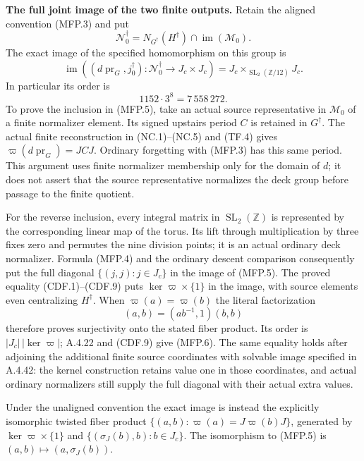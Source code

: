 \par\medskip\noindent\textbf{The full joint image of the two finite outputs.}\quad
Retain the aligned convention (MFP.3) and put
\[
 \mathcal N_0^\dagger
   =N_{G^\dagger}(H^\dagger)\cap\operatorname{im}(\mathcal M_0).
\]
The exact image of the specified homomorphism on this group is
\[
 \operatorname{im}\!\left(
   (d\operatorname{pr}_G,j_0^\dagger):
   \mathcal N_0^\dagger\longrightarrow J_c\times J_c\right)
     =J_c\mathbin{\times}_{\operatorname{SL}_2(\mathbb Z/12)}J_c.
                                                               \tag{MFP.5}
\]
In particular its order is
\[
                  1152\cdot3^8=7\,558\,272.
                                                               \tag{MFP.6}
\]
To prove the inclusion in (MFP.5), take an actual source representative
in $\mathcal M_0$ of a finite normalizer element.  Its signed upstairs
period $C$ is retained in $G^\dagger$.  The actual finite reconstruction
in (NC.1)--(NC.5) and (TF.4) gives
$\varpi(d\operatorname{pr}_G)=JCJ$.  Ordinary forgetting with (MFP.3)
has this same period.  This argument uses finite normalizer membership
only for the domain of $d$; it does not assert that the source
representative normalizes the deck group before passage to the
finite quotient.

For the reverse inclusion, every integral matrix in
$\operatorname{SL}_2(\mathbb Z)$ is represented by the corresponding
linear map of the torus.  Its lift through multiplication by three
fixes zero and permutes the nine division points; it is an actual
ordinary deck normalizer.  Formula (MFP.4) and the ordinary descent
comparison consequently put the full diagonal $\{(j,j):j\in J_c\}$
in the image of (MFP.5).  The proved equality (CDF.1)--(CDF.9) puts
$\ker\varpi\times\{1\}$ in the image, with source elements even
centralizing $H^\dagger$.  When $\varpi(a)=\varpi(b)$ the literal
factorization
\[
                   (a,b)=(ab^{-1},1)(b,b)
                                                               \tag{MFP.7}
\]
therefore proves surjectivity onto the stated fiber product.
Its order is $|J_c|\,|\ker\varpi|$; A.4.22 and (CDF.9) give (MFP.6).
The same equality holds after adjoining the additional finite source
coordinates with solvable image specified in A.4.42: the kernel
construction retains value one in those coordinates, and actual
ordinary normalizers still supply the full diagonal with their actual
extra values.

Under the unaligned convention the exact image is instead the
explicitly isomorphic twisted fiber product
$\{(a,b):\varpi(a)=J\varpi(b)J\}$, generated by
$\ker\varpi\times\{1\}$ and
$\{(\sigma_J(b),b):b\in J_c\}$.  The isomorphism to (MFP.5) is
$(a,b)\mapsto(a,\sigma_J(b))$.
